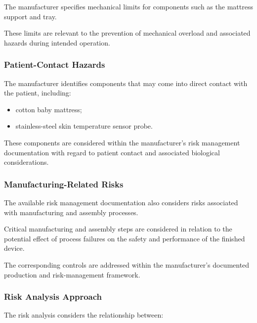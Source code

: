 The manufacturer specifies mechanical limits for components such as the
mattress support and tray.

These limits are relevant to the prevention of mechanical overload and
associated hazards during intended operation.

\subsubsection{Patient-Contact Hazards}

The manufacturer identifies components that may come into direct contact
with the patient, including:

\begin{itemize}

    \item cotton baby mattress;

    \item stainless-steel skin temperature sensor probe.

\end{itemize}

These components are considered within the manufacturer's risk management
documentation with regard to patient contact and associated biological
considerations.

\subsubsection{Manufacturing-Related Risks}

The available risk management documentation also considers risks associated
with manufacturing and assembly processes.

Critical manufacturing and assembly steps are considered in relation to
the potential effect of process failures on the safety and performance of
the finished device.

The corresponding controls are addressed within the manufacturer's
documented production and risk-management framework.

\subsubsection{Risk Analysis Approach}

The risk analysis considers the relationship between:

